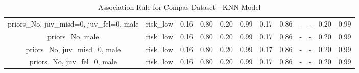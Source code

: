 \begin{table}[H]
{\begin{tabular}{|c|c|c|c|c|c|c|c|c|c|c|c|}
priors\_No, juv\_misd=0, juv\_fel=0, male & risk\_low & 0.16 & 0.80 & 0.20 & 0.99 & 0.17 & 0.86 & - & - & 0.20 & 0.99 \\
priors\_No, male & risk\_low & 0.16 & 0.80 & 0.20 & 0.99 & 0.17 & 0.86 & - & - & 0.20 & 0.99 \\
priors\_No, juv\_misd=0, male & risk\_low & 0.16 & 0.80 & 0.20 & 0.99 & 0.17 & 0.86 & - & - & 0.20 & 0.99 \\
priors\_No, juv\_fel=0, male & risk\_low & 0.16 & 0.80 & 0.20 & 0.99 & 0.17 & 0.86 & - & - & 0.20 & 0.99 \\
        \hline
        \end{tabular}
        }
        \\[10pt]
        \caption{Association Rule for Compas Dataset - KNN Model}
        \label{table:asso_rules_compas_KNN}
        \end{table}
        